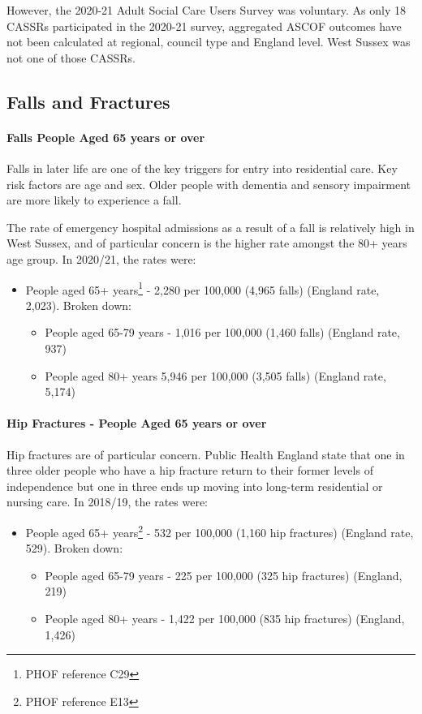 However, the 2020-21 Adult Social Care Users Survey was voluntary. As only 18 CASSRs participated in the 2020-21 survey, aggregated ASCOF outcomes have not been calculated at regional, council type and England level. West Sussex was not one of those CASSRs.

\subsection{Falls and Fractures}
\paragraph{Falls People Aged 65 years or over} Falls in later life are one of the key triggers for entry into residential care. Key risk factors are age and sex. Older people with dementia and sensory impairment are more likely to experience a fall.

The rate of emergency hospital admissions as a result of a fall is relatively high in West Sussex, and of particular concern is the higher rate amongst the 80+ years age group. In 2020/21, the rates were:

\begin{itemize}[noitemsep]
    \item People aged 65+ years\footnote{PHOF reference C29} - 2,280 per 100,000 (4,965 falls) (England rate, 2,023). Broken down:
    \begin{itemize}[noitemsep]
        \item People aged 65-79 years - 1,016 per 100,000 (1,460 falls) (England rate, 937)
        \item People aged 80+ years 5,946 per 100,000 (3,505 falls) (England rate, 5,174)
    \end{itemize}
\end{itemize}

\paragraph{Hip Fractures - People Aged 65 years or over} Hip fractures are of particular concern. Public Health England state that one in three older people who have a hip fracture return to their former levels of independence but one in three ends up moving into long-term residential or nursing care. In 2018/19, the rates were:

\begin{itemize}[noitemsep]
    \item People aged 65+ years\footnote{PHOF reference E13} - 532 per 100,000 (1,160 hip fractures) (England rate, 529). Broken down:
    \begin{itemize}[noitemsep]
        \item People aged 65-79 years - 225 per 100,000 (325 hip fractures) (England, 219)
        \item People aged 80+ years - 1,422 per 100,000 (835 hip fractures) (England, 1,426)
    \end{itemize}
\end{itemize}

